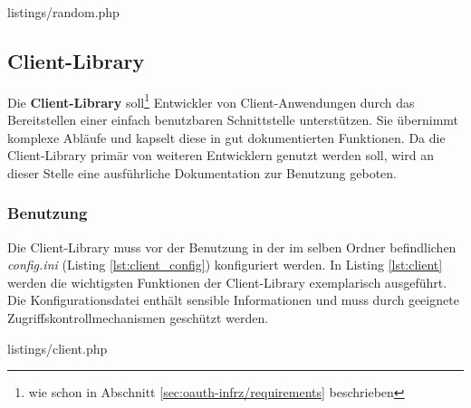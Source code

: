 \documentclass[12pt,a4paper,pointednumbers,abstracton]{scrartcl}
\begin{document}
\begin{minipage}{\textwidth}
	
	{listings/random.php}
\end{minipage}

\subsection{Client-Library}
\label{sec:oauth-infrz/client}

Die \textbf{Client-Library} soll\footnote{wie schon in Abschnitt \ref{sec:oauth-infrz/requirements} beschrieben} Entwickler von Client-Anwendungen durch das Bereitstellen einer einfach benutzbaren Schnittstelle unterstützen.
Sie übernimmt komplexe Abläufe und kapselt diese in gut dokumentierten Funktionen.
Da die Client-Library primär von weiteren Entwicklern genutzt werden soll, wird an dieser Stelle eine ausführliche Dokumentation zur Benutzung geboten.

\subsubsection{Benutzung}

Die Client-Library muss vor der Benutzung in der im selben Ordner befindlichen \emph{config.ini} (Listing \ref{lst:client_config}) konfiguriert werden.
In Listing \ref{lst:client} werden die wichtigsten Funktionen der Client-Library exemplarisch ausgeführt.
Die Konfigurationsdatei enthält sensible Informationen und muss durch geeignete Zugriffskontrollmechanismen geschützt werden.

\begin{minipage}{\textwidth}
	
	{listings/client.php}
\end{minipage}
\end{document}
